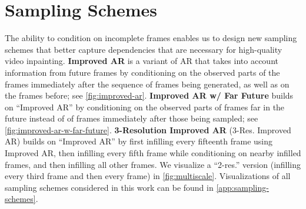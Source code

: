 \section{Sampling Schemes}\label{sec:samplingschemes}
The ability to condition on incomplete frames enables us to design new sampling schemes that better capture dependencies that are necessary for high-quality video inpainting. \textbf{Improved AR} is a variant of AR that takes into account information from future frames by conditioning on the observed parts of the frames immediately after the sequence of frames being generated, as well as on the frames before; see \cref{fig:improved-ar}. \textbf{Improved AR w/ Far Future} builds on ``Improved AR'' by conditioning on the observed parts of frames far in the future instead of of frames immediately after those being sampled; see \cref{fig:improved-ar-w-far-future}.
\textbf{3-Resolution Improved AR} (3-Res. Improved AR) builds on ``Improved AR'' by first infilling every fifteenth frame using Improved AR, then infilling every fifth frame while conditioning on nearby infilled frames, and then infilling all other frames. We visualize a ``2-res.'' version (infilling every third frame and then every frame) in \cref{fig:multiscale}. Visualizations of all sampling schemes considered in this work can be found in \cref{app:sampling-schemes}.




